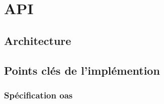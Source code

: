\section{API}
\label{chapter:api}

\subsection{Architecture}

\subsection{Points clés de l'implémention}

\subsubsection*{Spécification \Gls{oas}}